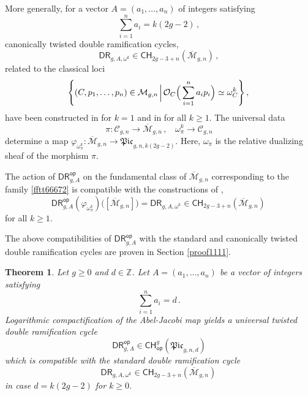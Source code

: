 \documentclass[a4paper,12pt]{article} %
\def\cO{\mathcal{O}}
\def\cM{{\mathcal{M}}}
\theoremstyle{definition}
\theoremstyle{plain}%
\newtheorem{theorem}[definition]{Theorem}
\renewcommand{\phi}{\varphi}
\newcommand{\Picabs}{\mathfrak{Pic}}
\begin{document}
More generally, 
for a vector $A = (a_1, \dots, a_n)$ of integers satisfying
$$\sum_{i=1}^n a_i = k(2g-2)\,, $$ 
canonically twisted double ramification cycles,
$$\mathsf{DR}_{g,A, \omega^k}
\in {\mathsf{CH}}_{2g-3+n}(\overline{\mathcal{M}}_{g,n})\, ,$$
related to the classical loci
\begin{equation*}
\left\{ (C, p_1, \dots, p_n) \in \cM_{g,n} \; \rule[-0.8em]{0.05em}{2em} \; 
\cO_C\Big(\sum_{i=1}^n a_i p_i\Big) \simeq  \omega^k_C \right\},\,  
\end{equation*}
have been constructed in
\cite{Guere2016A-generalizatio} for $k=1$ and in \cite{Holmes2017Extending-the-d,Holmes2017Jacobian-extens,Marcus2017Logarithmic-com} for all $k\geq 1$.
The universal data 
\begin{equation}\label{fftt66672}
\pi: \mathcal{C}_{g,n} \rightarrow \overline{\cM}_{g,n}\, , \ \ \ \ \omega_\pi^k \rightarrow \mathcal{C}_{g,n}
\end{equation}
determine a map 
$\phi_{\omega_\pi^k} : \overline{\cM}_{g,n} \to \Picabs_{g,n,k(2g-2)}$. 
Here,
$\omega_\pi$ is the relative dualizing sheaf
of the morphism $\pi$.

The action of $\mathsf{DR}^{\mathsf{op}}_{g,A}$ on the fundamental class
of $\overline{\mathcal{M}}_{g,n}$ corresponding to the family \eqref{fftt66672} is compatible with the constructions of \cite{Guere2016A-generalizatio,Holmes2017Extending-the-d,Holmes2017Jacobian-extens,Marcus2017Logarithmic-com},
$$\mathsf{DR}^{\mathsf{op}}_{g,A} (\phi_{\omega_\pi^k})\Big( [\overline{\mathcal{M}}_{g,n}]\Big)= \mathsf{DR}_{g,A, \omega^k}
\in {\mathsf{CH}}_{2g-3+n}(\overline{\mathcal{M}}_{g,n})
\, $$
for all $k\geq 1$.

The above compatibilities of $\mathsf{DR}^{\mathsf{op}}_{g,A}$ with
the standard and canonically twisted double ramification cycles are proven in Section \ref{proof1111}.

\begin{theorem} \label{cccc}
Let $g\geq 0$ and $d\in \mathbb{Z}$.
Let $A=(a_1,\ldots,a_n)$ be a vector of integers satisfying
$$\sum_{i=1}^n a_i=d\, .$$
Logarithmic compactification of the Abel-Jacobi map yields a universal twisted double
ramification 
cycle
$$\mathsf{DR}^{\mathsf{op}}_{g,A} \in {\mathsf{CH}}^g_{\mathsf{op}}(\Picabs_{g,n,d})$$
which is compatible with the standard double ramification
cycle 
$$\mathsf{DR}_{g,A, \omega^k}\in \mathsf{CH}_{2g-3+n}(\overline{\cM}_{g,n})\, $$
in case $d=k(2g-2)$ for $k\geq 0$.
\end{theorem}
\end{document}

